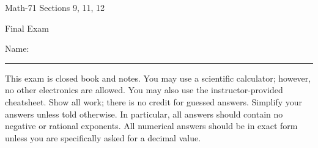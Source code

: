 \documentclass[letterpaper,12pt,fleqn]{article}
\begin{document}
\begin{center}
  \large
  Math-71 Sections 9, 11, 12

  \Large
  Final Exam
\end{center}

\vspace{0.5in}

Name: \rule{4in}{1pt}

\vspace{0.5in}

This exam is closed book and notes. You may use a scientific calculator; however, no other electronics are allowed.  You may
also use the instructor-provided cheatsheet.  Show all work; there is no credit for guessed answers.  Simplify your answers
unless told otherwise.  In particular, all answers should contain no negative or rational exponents.  All numerical answers
should be in exact form unless you are specifically asked for a decimal value.  

\vspace{0.5in}
\end{document}
